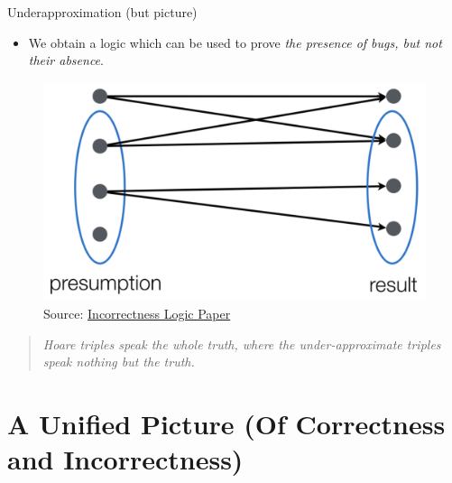 \documentclass[
  10pt,
  ignorenonframetext,
]{beamer}
\providecommand{\tightlist}{%
  \setlength{\itemsep}{0pt}\setlength{\parskip}{0pt}}
\begin{document}
\begin{frame}{Underapproximation (but picture)}
\label{underapproximation-but-picture}
\begin{itemize}
\tightlist
\item
  We obtain a logic which can be used to prove \emph{the presence of
  bugs, but not their absence}.
\end{itemize}

\begin{figure}
\centering
\includegraphics[width=\textwidth,height=0.5\textheight]{images/intro.png}
\caption{Source:
\href{https://dl.acm.org/doi/10.1145/3371078}{Incorrectness Logic
Paper}}
\end{figure}

\blockquote{\emph{Hoare triples speak the whole truth, where the under-approximate triples speak nothing but the truth.}}
\end{frame}

\section{A Unified Picture (Of Correctness and
Incorrectness)}\label{a-unified-picture-of-correctness-and-incorrectness}
\end{document}
